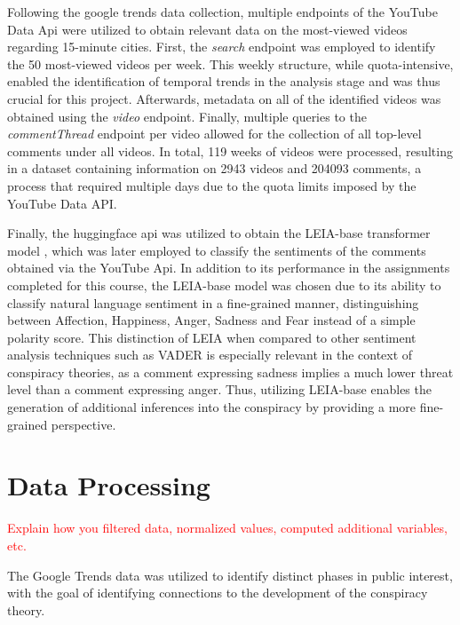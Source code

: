 \documentclass[fontsize=11pt, parskip=half]{scrartcl}
\begin{document}
    Following the google trends data collection, multiple endpoints of the YouTube Data Api were utilized to obtain relevant data on the most-viewed videos regarding 15-minute cities. First, the \textit{search} endpoint was employed to identify the 50 most-viewed videos per week. This weekly structure, while quota-intensive, enabled the identification of temporal trends in the analysis stage and was thus crucial for this project. Afterwards, metadata on all of the identified videos was obtained using the \textit{video} endpoint. Finally, multiple queries to the \textit{commentThread} endpoint per video allowed for the collection of all top-level comments under all videos. In total, 119 weeks of videos were processed, resulting in a dataset containing information on 2943 videos and 204093 comments, a process that required multiple days due to the quota limits imposed by the YouTube Data API.

    Finally, the huggingface api was utilized to obtain the LEIA-base transformer model \parencite{aroyehunLEIALinguisticEmbeddings2023}, which was later employed to classify the sentiments of the comments obtained via the YouTube Api. In addition to its performance in the assignments completed for this course, the LEIA-base model was chosen due to its ability to classify natural language sentiment in a fine-grained manner, distinguishing between Affection, Happiness, Anger, Sadness and Fear instead of a simple polarity score. This distinction of LEIA when compared to other sentiment analysis techniques such as VADER \parencite{cjhuttoVaderSentiment2020} is especially relevant in the context of conspiracy theories, as a comment expressing sadness implies a much lower threat level than a comment expressing anger. Thus, utilizing LEIA-base enables the generation of additional inferences into the conspiracy by providing a more fine-grained perspective.

\section{Data Processing}
\label{section:processing}

    \textcolor{red}{Explain how you filtered data, normalized values, computed additional variables, etc.}

    The Google Trends data  was utilized to identify distinct phases in public interest, with the goal of identifying connections to the development of the conspiracy theory. 
\end{document}
